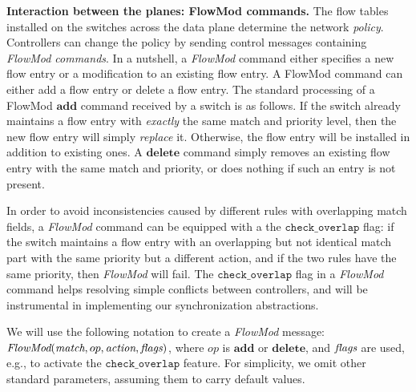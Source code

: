 \documentclass[conference]{sigcomm-alternate}
\newcommand{\add}{\textbf{add}\xspace}
\newcommand{\dele}{\textbf{delete}\xspace}
\newcommand{\FlowMod}{\emph{FlowMod}\xspace}
\newcommand{\match}{\emph{match}\xspace}
\newcommand{\action}{\emph{action}\xspace}
\newcommand{\flags}{\emph{flags}\xspace}
\newcommand{\checko}{\texttt{check\_overlap}\xspace}
\newcommand{\liron}[1]{\textit{\textcolor{mygreen}{[liron]: #1}}} %
\newcommand{\petr}[1]{\textit{\textcolor{blue}{[petr]: #1}}} %
\begin{document}
\vspace{1mm}
\noindent\textbf{Interaction between the planes: FlowMod commands.}
The flow tables installed on the switches across the data plane
determine the network \emph{policy}.
Controllers can change the policy by sending
control messages containing \emph{FlowMod commands}.
In a nutshell, a \emph{FlowMod} command either specifies a new flow entry or
a modification to an existing flow entry.
%
%
%
%
A FlowMod command can either add a flow entry or delete a flow entry.
The standard processing of a FlowMod $\add$ command received by a switch is
as follows.
If the switch already maintains a flow entry with \emph{exactly} the
same match and priority level, then the new flow entry will simply \emph{replace} it.
Otherwise, the flow entry will be installed in addition to existing
ones.
A $\dele$ command simply removes an existing flow entry with the same
match and priority,  or does nothing if such an entry is not present.



In order to avoid inconsistencies caused by different rules with
overlapping match fields, a \emph{FlowMod} command can be equipped with a the $\checko$ flag:
if the switch maintains a flow entry with an overlapping but not
identical match part with the same priority but a different action,
 and if the two rules have the same priority, then
\emph{FlowMod} will fail.
The $\checko$ flag in a \emph{FlowMod} command helps resolving simple
conflicts between controllers, and will be instrumental
in implementing our synchronization abstractions.

We will use the following notation to create a \emph{FlowMod} message:
$\FlowMod(\match, op, \action, \flags)$, where
$op$ is $\add$ or $\dele$, and $\flags$ are used, e.g.,  to activate the $\checko$
feature.
For simplicity, we omit other standard parameters, assuming them to carry
default values.
\end{document}
